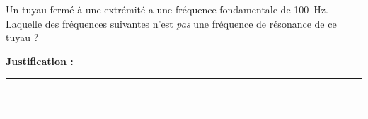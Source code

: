 Un tuyau fermé à une extrémité a une fréquence fondamentale de \qty{100}{Hz}. Laquelle des fréquences suivantes n'est \emph{pas} une fréquence de résonance de ce tuyau ?

\choices

\noindent\textbf{Justification :} \hrulefill \\[2.5ex]
\rule{\linewidth}{0.4pt} \\[2.5ex]
\rule{\linewidth}{0.4pt}
\vfill
